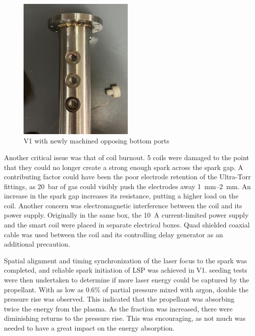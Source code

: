 \begin{figure}[!ht]
    \centering
    \includegraphics[width=0.5\textwidth]{assets/5 discussion/Bottom ports machined.jpg}
    \caption{V1 with newly machined opposing bottom ports}
    \label{fig: V1 opposing ports}
\end{figure}

Another critical issue was that of coil burnout. 5 coils were damaged to the point that they could no longer create a strong enough spark across the spark gap. A contributing factor could have been the poor electrode retention of the Ultra-Torr fittings, as \qty{20}{bar} of gas could visibly push the electrodes away \qtyrange{1}{2}{mm}. An increase in the spark gap increases its resistance, putting a higher load on the coil. Another concern was electromagnetic interference between the coil and its power supply. Originally in the same box, the \qty{10}{A} current-limited power supply and the smart coil were placed in separate electrical boxes. Quad shielded coaxial cable was used between the coil and its controlling delay generator as an additional precaution. 

Spatial alignment and timing synchronization of the laser focus to the spark was completed, and reliable spark initiation of LSP was achieved in V1.  seeding tests were then undertaken to determine if more laser energy could be captured by the propellant. With as low as 0.6\% of  partial pressure mixed with argon, double the pressure rise was observed. This indicated that the propellant was absorbing twice the energy from the plasma. As the  fraction was increased, there were diminishing returns to the pressure rise. This was encouraging, as not much  was needed to have a great impact on the energy absorption.

